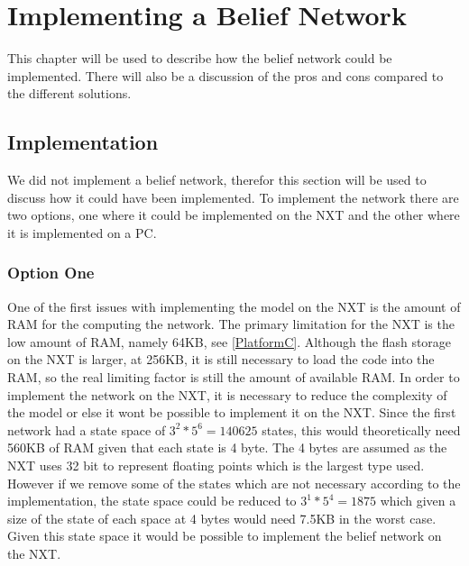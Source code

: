 \chapter{Implementing a Belief Network}
This chapter will be used to describe how the belief network could be
implemented. There will also be a discussion of the pros and cons compared to
the different solutions.

\section{Implementation}
We did not implement a belief network, therefor this section will be used to
discuss how it could have been implemented. To implement the network there are
two options, one where it could be implemented on the NXT and the other where it is
implemented on a PC.

%

\subsection{Option One}
One of the first issues with implementing the model on the NXT is the amount of
RAM for the computing the network. The primary limitation for the NXT is the
low amount of RAM, namely 64KB, see \autoref{PlatformC}. Although the flash
storage on the NXT is larger, at 256KB, it is still necessary to load the code
into the RAM, so the real limiting factor is still the amount of available RAM.
In order to implement the network on the NXT, it is necessary to reduce the
complexity of the model or else it wont be possible to implement it on the NXT.
Since the first network had a state space of $3^2*5^6 = 140625$ states, this
would theoretically need 560KB of RAM given that each state is 4 byte. The 4
bytes are assumed as the NXT uses 32 bit to represent floating points which is
the largest type used. However if we remove some of the states which are not
necessary according to the implementation, the state space could be reduced to
$3^1*5^4 = 1875$ which given a size of the state of each space at 4 bytes would
need 7.5KB in the worst case. Given this state space it would be possible to
implement the belief network on the NXT.\nl


